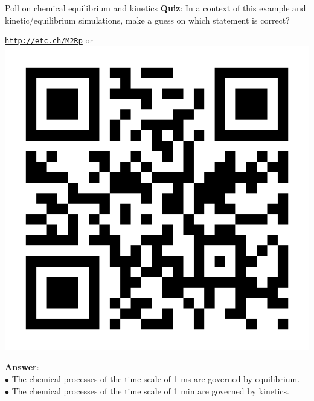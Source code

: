 \begin{frame}{Poll on chemical equilibrium and kinetics }
\alert{\bf Quiz}: In a context of this example and kinetic/equilibrium simulations, make a guess on which statement is correct?
\begin{center}
\vskip 10pt
{\Large \href{http://etc.ch/M2Rp}{\textcolor{indigo(dye)}{\tt http://etc.ch/M2Rp}}}
or 
\includegraphics[height=0.25\columnwidth]{figures/intro/poll.png}
\end{center}    
%
\hiddenpause
{\bf Answer}: \\
\qquad $\bullet$ The chemical processes of the time scale of 1 ms are governed by equilibrium. \\ 
\qquad $\bullet$ The chemical processes of the time scale of 1 min are governed by kinetics.
\end{frame}
%

